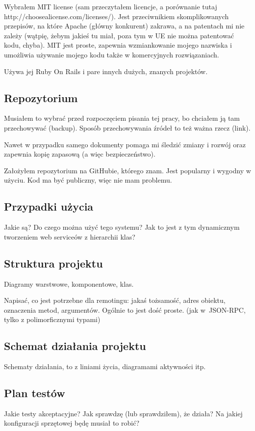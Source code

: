 Wybrałem MIT license (sam przeczytałem licencje, a porównanie tutaj http://choosealicense.com/licenses/). Jest przeciwnikiem skomplikowanych przepisów, na które Apache (główny konkurent) zakrawa, a na patentach mi nie zależy (wątpię, żebym jakieś tu miał, poza tym w UE nie można patentować kodu, chyba). MIT jest proste, zapewnia wzmiankowanie mojego nazwiska i umożliwia używanie mojego kodu także w komercyjnych rozwiązaniach.

Używa jej Ruby On Rails i pare innych dużych, znanych projektów.

\subsection{Repozytorium}
Musiałem to wybrać przed rozpoczęciem pisania tej pracy, bo chciałem ją tam przechowywać (backup). Sposób przechowywania źródeł to też ważna rzecz (link).

Nawet w przypadku samego dokumenty pomaga mi śledzić zmiany i rozwój oraz zapewnia kopię zapasową (a więc bezpieczeństwo).

Założyłem repozytorium na GitHubie, którego znam. Jest popularny i wygodny w użyciu. Kod ma być publiczny, więc nie mam problemu. 




\subsection{Przypadki użycia}
Jakie są? Do czego można użyć tego systemu? Jak to jest z tym dynamicznym tworzeniem web serviceów z hierarchii klas?



\subsection{Struktura projektu}
Diagramy warstwowe, komponentowe, klas.

Napisać, co jest potrzebne dla remotingu: jakaś tożsamość, adres obiektu, oznaczenia metod, argumentów. Ogólnie to jest dość proste. (jak w~JSON-RPC, tylko z polimorficznymi typami)


\subsection{Schemat działania projektu}
Schematy działania, to z liniami życia, diagramami aktywności itp.


\subsection{Plan testów}
Jakie testy akceptacyjne? Jak sprawdzę (lub sprawdziłem), że działa? Na jakiej konfiguracji sprzętowej będę musiał to robić?

